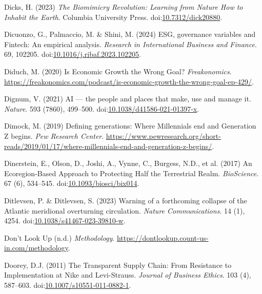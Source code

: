 \documentclass[
  letterpaper,
  DIV=11,
  numbers=noendperiod]{scrartcl}
\newlength{\cslhangindent}
\newenvironment{CSLReferences}[2] %
 {\begin{list}{}{%
  \setlength{\itemindent}{0pt}
  \setlength{\leftmargin}{0pt}
  \setlength{\parsep}{0pt}
  \ifodd #1
   \setlength{\leftmargin}{\cslhangindent}
   \setlength{\itemindent}{-1\cslhangindent}
  \fi
  \setlength{\itemsep}{#2\baselineskip}}}
 {\end{list}}
\begin{document}
\begin{CSLReferences}{0}{1}
Dicks, H. (2023) \emph{The {Biomimicry Revolution}: {Learning} from
{Nature How} to {Inhabit} the {Earth}}. Columbia University Press.
doi:\href{https://doi.org/10.7312/dick20880}{10.7312/dick20880}.

Dicuonzo, G., Palmaccio, M. \& Shini, M. (2024) {ESG}, governance
variables and {Fintech}: {An} empirical analysis. \emph{Research in
International Business and Finance}. 69, 102205.
doi:\href{https://doi.org/10.1016/j.ribaf.2023.102205}{10.1016/j.ribaf.2023.102205}.

Diduch, M. (2020) Is {Economic Growth} the {Wrong Goal}?
\emph{Freakonomics}.
\url{https://freakonomics.com/podcast/is-economic-growth-the-wrong-goal-ep-429/}.

Dignum, V. (2021) {AI} --- the people and places that make, use and
manage it. \emph{Nature}. 593 (7860), 499--500.
doi:\href{https://doi.org/10.1038/d41586-021-01397-x}{10.1038/d41586-021-01397-x}.

Dimock, M. (2019) Defining generations: {Where Millennials} end and
{Generation Z} begins. \emph{Pew Research Center}.
\url{https://www.pewresearch.org/short-reads/2019/01/17/where-millennials-end-and-generation-z-begins/}.

Dinerstein, E., Olson, D., Joshi, A., Vynne, C., Burgess, N.D., et al.
(2017) An {Ecoregion-Based Approach} to {Protecting Half} the
{Terrestrial Realm}. \emph{BioScience}. 67 (6), 534--545.
doi:\href{https://doi.org/10.1093/biosci/bix014}{10.1093/biosci/bix014}.

Ditlevsen, P. \& Ditlevsen, S. (2023) Warning of a forthcoming collapse
of the {Atlantic} meridional overturning circulation. \emph{Nature
Communications}. 14 (1), 4254.
doi:\href{https://doi.org/10.1038/s41467-023-39810-w}{10.1038/s41467-023-39810-w}.

Don't Look Up (n.d.) \emph{Methodology}.
\url{https://dontlookup.count-us-in.com/methodology}.

Doorey, D.J. (2011) The {Transparent Supply Chain}: From {Resistance} to
{Implementation} at {Nike} and {Levi-Strauss}. \emph{Journal of Business
Ethics}. 103 (4), 587--603.
doi:\href{https://doi.org/10.1007/s10551-011-0882-1}{10.1007/s10551-011-0882-1}.


\end{CSLReferences}
\end{document}
